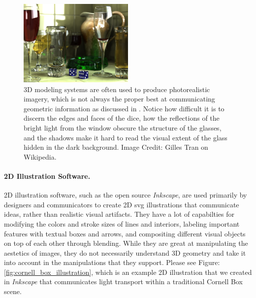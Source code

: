 \documentclass[12pt, letterpaper]{article}
\begin{document}
	\begin{figure}[h]
	\centering
	\includegraphics[width=0.5\textwidth]{PhotorealisticRendering}
	\caption{3D modeling systems are often used to produce photorealistic imagery, which is not always the proper best at communicating geometric information as discussed in \cite{JDA08}.
		Notice how difficult it is to discern the edges and faces of the dice,
		how the reflections of the bright light from the window obscure the structure of the glasses, and the shadows make it hard to read the visual extent of the glass hidden in the dark background.
		Image Credit: Gilles Tran on Wikipedia.}
	\label{fig:photorealistic_rendering}
	\end{figure}

	\paragraph{2D Illustration Software.}

	2D illustration software, such as the open source \emph{Inkscape}, are used primarily by designers and communicators to create 2D svg illustrations that
	communicate ideas, rather than realistic visual artifacts. They have a lot of capabilties for modifying the colors and stroke sizes of lines and interiors,
	labeling important features with textual boxes and arrows, and compositing different visual objects on top of each other through blending.
	While they are great at manipulating the aestetics of images, they do not necessarily understand 3D geometry and take it into account in the manipulations
	that they support. Please see Figure: \ref{fig:cornell_box_illustration}, which is an example 2D illustration that we created in \emph{Inkscape} that communicates light transport within a traditional Cornell Box scene.
\end{document}
